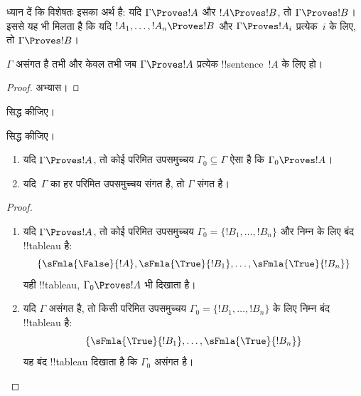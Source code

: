 \documentclass[../../../include/open-logic-section]{subfiles}
\begin{document}
ध्यान दें कि विशेषतः इसका अर्थ है: यदि $\Gamma \Proves !A$ और $!A
\Proves !B$, तो $\Gamma \Proves !B$। इससे यह भी मिलता है कि यदि $!A_1,
\dots, !A_n \Proves !B$ और $\Gamma \Proves !A_i$ प्रत्येक~$i$ के लिए, तो
$\Gamma \Proves !B$।

\begin{prop}
$\Gamma$ असंगत है तभी और केवल तभी जब $\Gamma \Proves !A$ प्रत्येक
!!{sentence}~$!A$ के लिए हो।
\end{prop}

\begin{proof}
अभ्यास।
\end{proof}

\begin{prob}
 सिद्ध कीजिए।
\end{prob}
\tagendprob

\begin{prob}
 सिद्ध कीजिए।
\end{prob}
\tagendprob

\begin{prop}[संहतता]
  \begin{enumerate}
  \item यदि $\Gamma \Proves !A$, तो कोई परिमित उपसमुच्चय $\Gamma_0
    \subseteq \Gamma$ ऐसा है कि $\Gamma_0 \Proves !A$।
  \item यदि~$\Gamma$ का हर परिमित उपसमुच्चय संगत है, तो $\Gamma$ संगत है।
  \end{enumerate}
\end{prop}

\begin{proof}
  \begin{enumerate}
    \item यदि $\Gamma \Proves !A$, तो कोई परिमित उपसमुच्चय
      $\Gamma_0 = \{!B_1, \dots, !B_n\}$ और निम्न के लिए बंद !!{tableau}
      है:
      \[
      \{\sFmla{\False}{!A}, \sFmla{\True}{!B_1}, \dots, \sFmla{\True}{!B_n}\}
      \]
      यही !!{tableau}, $\Gamma_0 \Proves !A$ भी दिखाता है।
    \item यदि $\Gamma$ असंगत है, तो किसी परिमित उपसमुच्चय
      $\Gamma_0 = \{!B_1, \dots, !B_n\}$ के लिए निम्न बंद !!{tableau} है:
      \[
      \{\sFmla{\True}{!B_1}, \dots, \sFmla{\True}{!B_n}\}
      \]
      यह बंद !!{tableau} दिखाता है कि $\Gamma_0$ असंगत है।
  \end{enumerate}
\end{proof}
\end{document}
